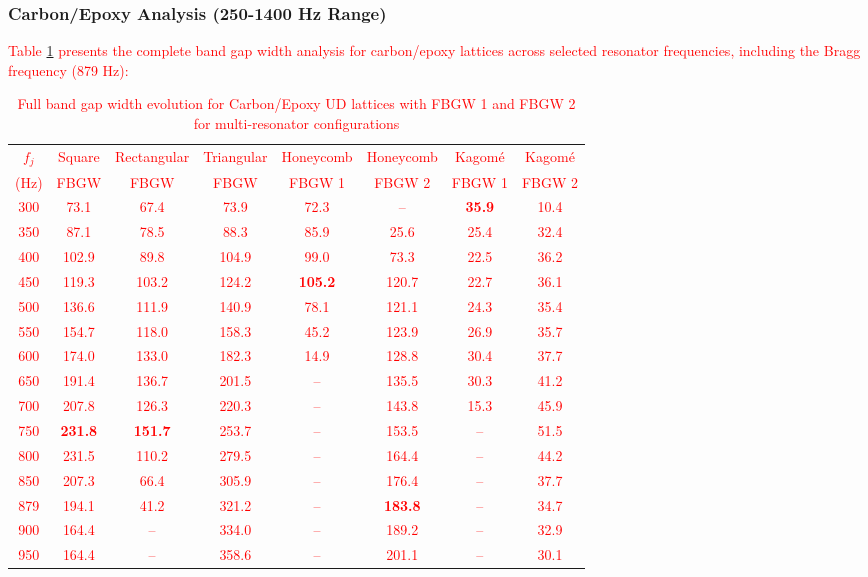 \documentclass[review,numbers,sort&compress]{elsarticle}
\begin{document}
\subsubsection{Carbon/Epoxy Analysis (250-1400 Hz Range)}

\textcolor{red}{Table \ref{tab:carbon_results} presents the complete band gap width analysis for carbon/epoxy lattices across selected resonator frequencies, including the Bragg frequency (879 Hz):}

\newpage
\textcolor{red}{\begin{table}[!htb]
\centering
\caption{Full band gap width evolution for Carbon/Epoxy UD lattices with FBGW 1 and FBGW 2 for multi-resonator configurations\protect\footnotemark[1]}
\label{tab:carbon_results}
\small
\begin{tabular}{cccccccc}
\hline
$f_j$ & Square & Rectangular & Triangular & Honeycomb & Honeycomb & Kagom\'{e} & Kagom\'{e} \\
(Hz) & FBGW & FBGW & FBGW & FBGW 1 & FBGW 2 & FBGW 1 & FBGW 2 \\
\hline
300 & 73.1 & 67.4 & 73.9 & 72.3 & -- & \textbf{35.9} & 10.4 \\
350 & 87.1 & 78.5 & 88.3 & 85.9 & 25.6 & 25.4 & 32.4 \\
400 & 102.9 & 89.8 & 104.9 & 99.0 & 73.3 & 22.5 & 36.2 \\
450 & 119.3 & 103.2 & 124.2 & \textbf{105.2} & 120.7 & 22.7 & 36.1 \\
500 & 136.6 & 111.9 & 140.9 & 78.1 & 121.1 & 24.3 & 35.4 \\
550 & 154.7 & 118.0 & 158.3 & 45.2 & 123.9 & 26.9 & 35.7 \\
600 & 174.0 & 133.0 & 182.3 & 14.9 & 128.8 & 30.4 & 37.7 \\
650 & 191.4 & 136.7 & 201.5 & -- & 135.5 & 30.3 & 41.2 \\
700 & 207.8 & 126.3 & 220.3 & -- & 143.8 & 15.3 & 45.9 \\
750 & \textbf{231.8} & \textbf{151.7} & 253.7 & -- & 153.5 & -- & 51.5 \\
800 & 231.5 & 110.2 & 279.5 & -- & 164.4 & -- & 44.2 \\
850 & 207.3 & 66.4 & 305.9 & -- & 176.4 & -- & 37.7 \\
879\protect\footnotemark[2] & 194.1 & 41.2 & 321.2 & -- & \textbf{183.8} & -- & 34.7 \\
900 & 164.4 & -- & 334.0 & -- & 189.2 & -- & 32.9 \\
950 & 164.4 & -- & 358.6 & -- & 201.1 & -- & 30.1 \\

\end{tabular}
\end{table}}
\end{document}
